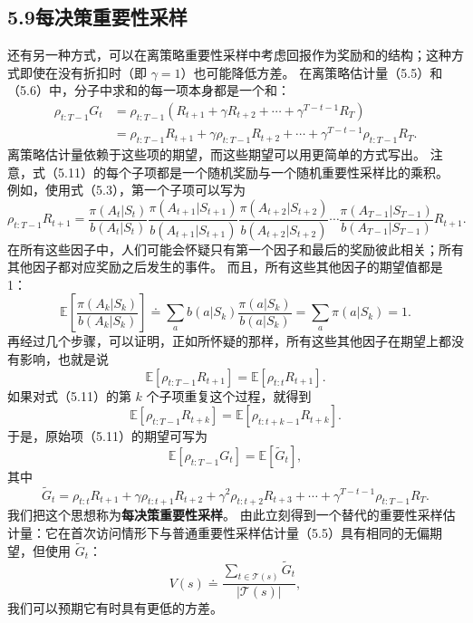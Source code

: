 \documentclass[UTF8, 12pt, fontset=fandol, oneside]{ctexart}
\begin{document}
\subsection*{5.9\quad *每决策重要性采样}

还有另一种方式，可以在离策略重要性采样中考虑回报作为奖励和的结构；这种方式即使在没有折扣时（即 $\gamma=1$）也可能降低方差。
在离策略估计量（5.5）和（5.6）中，分子中求和的每一项本身都是一个和：
\begin{equation}
\begin{aligned}
\rho_{t:T-1}G_t
&=\rho_{t:T-1}\left(R_{t+1}+\gamma R_{t+2}+\cdots+\gamma^{T-t-1}R_T\right)\\
&=\rho_{t:T-1}R_{t+1}
+\gamma\rho_{t:T-1}R_{t+2}
+\cdots+\gamma^{T-t-1}\rho_{t:T-1}R_T.
\end{aligned}
\end{equation}
离策略估计量依赖于这些项的期望，而这些期望可以用更简单的方式写出。
注意，式（5.11）的每个子项都是一个随机奖励与一个随机重要性采样比的乘积。
例如，使用式（5.3），第一个子项可以写为
\begin{equation}
\rho_{t:T-1}R_{t+1}
=\frac{\pi(A_t|S_t)}{b(A_t|S_t)}
\frac{\pi(A_{t+1}|S_{t+1})}{b(A_{t+1}|S_{t+1})}
\frac{\pi(A_{t+2}|S_{t+2})}{b(A_{t+2}|S_{t+2})}
\cdots
\frac{\pi(A_{T-1}|S_{T-1})}{b(A_{T-1}|S_{T-1})}
R_{t+1}.
\end{equation}
在所有这些因子中，人们可能会怀疑只有第一个因子和最后的奖励彼此相关；所有其他因子都对应奖励之后发生的事件。
而且，所有这些其他因子的期望值都是 1：
\begin{equation}
\mathbb{E}\!\left[\frac{\pi(A_k|S_k)}{b(A_k|S_k)}\right]
\doteq \sum_a b(a|S_k)\frac{\pi(a|S_k)}{b(a|S_k)}
=\sum_a \pi(a|S_k)=1.
\end{equation}
再经过几个步骤，可以证明，正如所怀疑的那样，所有这些其他因子在期望上都没有影响，也就是说
\begin{equation}
\mathbb{E}[\rho_{t:T-1}R_{t+1}]
=\mathbb{E}[\rho_{t:t}R_{t+1}].
\end{equation}
如果对式（5.11）的第 $k$ 个子项重复这个过程，就得到
\[
\mathbb{E}[\rho_{t:T-1}R_{t+k}]
=\mathbb{E}[\rho_{t:t+k-1}R_{t+k}].
\]
于是，原始项（5.11）的期望可写为
\[
\mathbb{E}[\rho_{t:T-1}G_t]=\mathbb{E}[\tilde G_t],
\]
其中
\[
\tilde G_t=\rho_{t:t}R_{t+1}
+\gamma\rho_{t:t+1}R_{t+2}
+\gamma^2\rho_{t:t+2}R_{t+3}
+\cdots+\gamma^{T-t-1}\rho_{t:T-1}R_T.
\]
我们把这个思想称为\textbf{每决策重要性采样}。
由此立刻得到一个替代的重要性采样估计量：它在首次访问情形下与普通重要性采样估计量（5.5）具有相同的无偏期望，但使用 $\tilde G_t$：
\begin{equation}
V(s)\doteq \frac{\sum_{t\in\mathcal{T}(s)}\tilde G_t}{|\mathcal{T}(s)|},
\end{equation}
我们可以预期它有时具有更低的方差。
\end{document}
